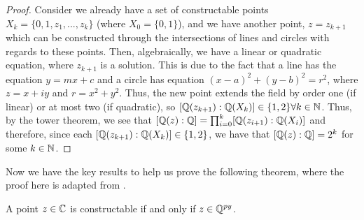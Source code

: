 \begin{proof}  
   Consider we already have a set of constructable points $X_k = \{0,1,z_1,...,z_k\}$ (where $X_0=\{0,1\}$), and we have another point, $z=z_{k+1}$ which can be constructed through the intersections of lines and circles with regards to these points. Then, algebraically, we have a linear or quadratic equation, where $z_{k+1}$ is a solution. This is due to the fact that a line has the equation $y=mx+c$ and a circle has equation $(x-a)^2+(y-b)^2=r^2$, where $z=x+iy$ and $r=x^2+y^2$. Thus, the new point extends the field by order one (if linear) or at most two (if quadratic), so $[\mathbb Q(z_{k+1}):\mathbb Q(X_k)] \in \{1,2\} \forall k \in \mathbb N$. Thus, by the tower theorem, we see that $[\mathbb Q(z):\mathbb Q] = \prod_{i=0}^k [\mathbb Q(z_{i+1}):\mathbb Q(X_i)]$ and therefore, since each $[\mathbb Q(z_{k+1}):\mathbb Q(X_k)] \in \{1,2\}$, we have that $[\mathbb Q(z):\mathbb Q] = 2^k$ for some $k \in \mathbb N$.
\end{proof}


Now we have the key results to help us prove the following theorem, where the proof here is adapted from \cite{constructions-and-galois}.

\begin{theorem}
    A point $z \in \mathbb C$ is constructable if and only if $z \in \mathbb Q^{py}$.
\end{theorem}

